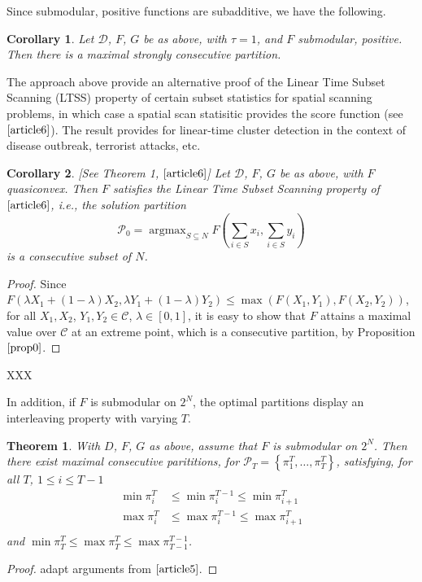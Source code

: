 \documentclass{article}
\newtheorem{thm}{Theorem}
\newtheorem{corollary}{Corollary}
\theoremstyle{case}
\DeclareMathOperator*{\argmax}{argmax} %
\begin{document}
Since submodular, positive functions are subadditive, we have the following.

\begin{corollary} \label{cor0}
Let $\mathcal{D}$, $F$, $G$ be as above, with $\tau = 1$, and $F$ submodular, positive. Then there is a maximal strongly consecutive partition.
\end{corollary}

The approach above provide an alternative proof of the Linear Time Subset Scanning (LTSS) property of certain subset statistics for spatial scanning problems, in which case a spatial scan statisitic provides the score function (see $\cite{article6}$). The result provides for linear-time cluster detection in the context of disease outbreak, terrorist attacks, etc.

\begin{corollary} \label{cor1}
[See Theorem 1, $\cite{article6}$] Let $\mathcal{D}$, $F$, $G$ be as above, with $F$ quasiconvex. Then $F$ satisfies the Linear Time Subset Scanning property of $\cite{article6}$, i.e., the solution partition
\[
\mathcal{P_0} = \argmax_{S \subseteq N} F(\sum_{i \in S}x_i, \sum_{i \in S}y_i)
\]
is a consecutive subset of $N$.
\end{corollary}
\begin{proof}
Since $F(\lambda X_1 + \left( 1 - \lambda\right)X_2, \lambda Y_1 + \left( 1 - \lambda\right) Y_2) \leq \max{\left(F(X_1, Y_1), F(X_2, Y_2)\right)}$, for all $X_1, X_2$, $Y_1, Y_2 \in \mathcal{C}$, $\lambda \in \left[ 0,1\right]$, it is easy to show that $F$ attains a maximal value over $\mathcal{C}$ at an extreme point, which is a consecutive partition, by Proposition $\cite{prop0}$.
\end{proof}

XXX

In addition, if $F$ is submodular on $2^N$, the optimal partitions display an interleaving property with varying $T$.
\begin{thm} \label{thm2}
With $D$, $F$, $G$ as above, assume that $F$ is submodular on $2^N$. Then there exist maximal consecutive parititions, for $\mathcal{P}_T = \left\lbrace \pi_1^T, \dots, \pi_T^T\right\rbrace$, satisfying, for all $T$, $1 \leq i \leq T-1$
\begin{align*}
\min{\pi_i^T} &\leq \min{\pi_i^{T-1}} \leq \min{\pi_{i+1}^T} \\
\max{\pi_i^T} &\leq \max{\pi_i^{T-1}} \leq \max{\pi_{i+1}^T} \\
\end{align*}
and $\min{\pi_T^T} \leq \max{\pi_T^T} \leq \max{\pi_{T-1}^{T-1}}$.
\end{thm}
\begin{proof}
adapt arguments from $\cite{article5}$.
\end{proof}
\end{document}
